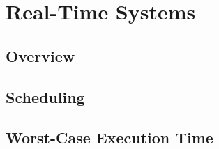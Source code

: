 \chapter{Real-Time Systems}
\label{chap:realtime_systems}

\section{Overview}

\section{Scheduling}

\section{Worst-Case Execution Time}
